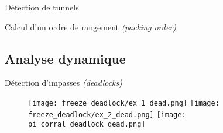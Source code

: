             \begin{frame}{Détection de tunnels}
            \end{frame}

            \begin{frame}{Calcul d'un ordre de rangement \textit{(packing order)}}
            \end{frame}

        \subsection{Analyse dynamique}

            \begin{frame}{Détection d'impasses \textit{(deadlocks)}}
                \begin{figure}
                    \centering
                        {\texttt{[image: freeze\_deadlock/ex\_1\_dead.png]}}
                        {\texttt{[image: freeze\_deadlock/ex\_2\_dead.png]}}
                        {\texttt{[image: pi\_corral\_deadlock\_dead.png]}}
                \end{figure}
            \end{frame}

